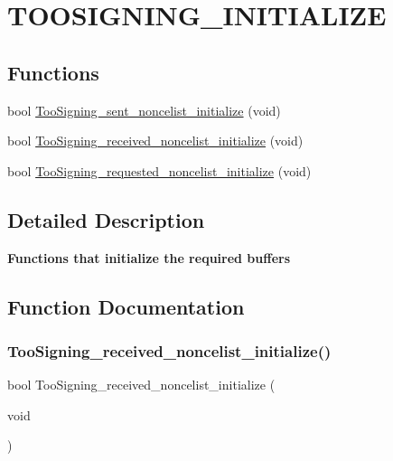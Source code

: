 \hypertarget{group__TOOSIGNING__INITIALIZE}{}\section{T\+O\+O\+S\+I\+G\+N\+I\+N\+G\+\_\+\+I\+N\+I\+T\+I\+A\+L\+I\+ZE}
\label{group__TOOSIGNING__INITIALIZE}
\subsection*{Functions}
\begin{DoxyCompactItemize}
\item 
bool \hyperlink{group__TOOSIGNING__INITIALIZE_ga0ad0c6af4c20b80f75ccf3d4a2804a0c}{Too\+Signing\+\_\+sent\+\_\+noncelist\+\_\+initialize} (void)
\item 
bool \hyperlink{group__TOOSIGNING__INITIALIZE_ga24011c99b90b9070adb424cee01a3fc2}{Too\+Signing\+\_\+received\+\_\+noncelist\+\_\+initialize} (void)
\item 
bool \hyperlink{group__TOOSIGNING__INITIALIZE_gafd247c5271ff63bfcde14ef94060002d}{Too\+Signing\+\_\+requested\+\_\+noncelist\+\_\+initialize} (void)
\end{DoxyCompactItemize}


\subsection{Detailed Description}
{\bfseries Functions that initialize the required buffers} 

\subsection{Function Documentation}
\mbox{\label{group__TOOSIGNING__INITIALIZE_ga24011c99b90b9070adb424cee01a3fc2}} 
\subsubsection{\texorpdfstring{Too\+Signing\+\_\+received\+\_\+noncelist\+\_\+initialize()}{TooSigning\_received\_noncelist\_initialize()}}
{\footnotesize\ttfamily bool Too\+Signing\+\_\+received\+\_\+noncelist\+\_\+initialize (\begin{DoxyParamCaption}\item[{void}]{ }\end{DoxyParamCaption})}

